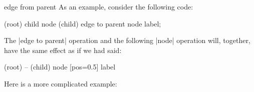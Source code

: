 \begin{pathoperation}{edge from parent}{}
  As an example, consider the following code:
\begin{codeexample}
\node (root) {} child {node (child) {} edge to parent node {label}};    
\end{codeexample}
  The |edge to parent| operation and the following |node| operation
  will, together, have the same effect as if we had said:
\begin{codeexample}
(root) -- (child) node [pos=0.5] {label}
\end{codeexample}

  Here is a more complicated example:
\begin{codeexample}[]
\end{codeexample}

\end{pathoperation}



